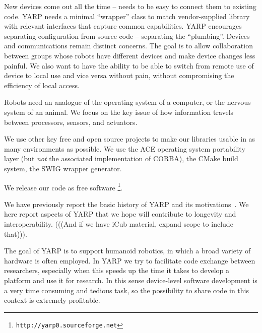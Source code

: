 





New devices come out all the time -- needs to be easy to connect them
to existing code.  YARP needs a minimal ``wrapper'' class to match
vendor-supplied library with relevant interfaces that capture common
capabilities.  YARP encourages separating configuration from source
code -- separating the ``plumbing''.  Devices and communications
remain distinct concerns.  The goal is to allow collaboration between
groups whose robots have different devices and make device changes
less painful.  We also want to have the ability to be able to switch
from remote use of device to local use and vice versa without pain,
without compromising the efficiency of local access.

Robots need an analogue of the operating system of a computer, or the
nervous system of an animal.  We focus on the key issue of how information
travels between processors, sensors, and actuators.

We use other key free and open source projects to make
our libraries usable in as many environments as possible.  We use the
ACE operating system portability layer (but {\it not} the associated
implementation of CORBA), the CMake build system, the SWIG wrapper
generator.

We release our code as free software 
\protect\footnote{\tt http://yarp0.sourceforge.net}.

We have previously report the basic history of YARP and its 
motivations~\cite{metta2006yarp}.
We here report aspects of YARP that we hope will contribute to
longevity and interoperability.  (((And if we have iCub material,
expand scope to include that))).


The goal of YARP is to support humanoid robotics, in which a broad 
variety of hardware is often employed. In YARP we try to facilitate code 
exchange between researchers, especially when this speeds up the time 
it takes to develop a platform and use it for research. In this sense 
device-level software development is a very time consuming and tedious 
task, so the possibility to share code in this context is extremely 
profitable. 


